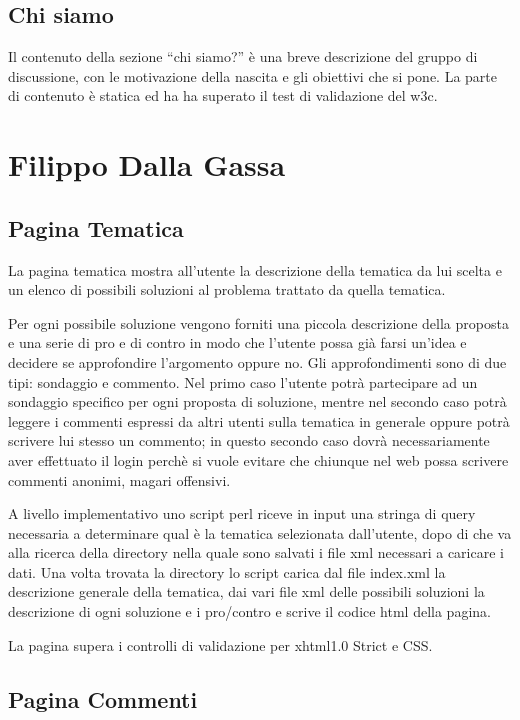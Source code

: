 \documentclass[a4paper,10pt]{article}
\begin{document}
\subsection{Chi siamo}

Il contenuto della sezione ``chi siamo?'' \`e una breve descrizione del gruppo di discussione, con le motivazione della nascita e gli obiettivi che si pone. La parte di contenuto \`e statica ed ha ha superato il test di validazione del w3c.

\section{Filippo Dalla Gassa}

\subsection{Pagina Tematica}

La pagina tematica mostra all'utente la descrizione della tematica da lui scelta e un elenco di possibili soluzioni al problema trattato da quella tematica.

Per ogni possibile soluzione vengono forniti una piccola descrizione della proposta e una serie di pro e di contro in modo che l'utente possa gi\`a farsi un'idea e decidere se approfondire l'argomento oppure no. Gli approfondimenti sono di due tipi: sondaggio e commento. Nel primo caso l'utente potr\`a partecipare ad un sondaggio specifico per ogni proposta di soluzione, mentre nel secondo caso potr\`a leggere i commenti espressi da altri utenti sulla tematica in generale oppure potr\`a scrivere lui stesso un commento; in questo secondo caso dovr\`a necessariamente aver effettuato il login perch\`e si vuole evitare che chiunque nel web possa scrivere commenti anonimi, magari offensivi.

A livello implementativo uno script perl riceve in input una stringa di query necessaria a determinare qual \`e la tematica selezionata dall'utente, dopo di che va alla ricerca della directory nella quale sono salvati i file xml necessari a caricare i dati. Una volta trovata la directory lo script carica dal file index.xml la descrizione generale della tematica, dai vari file xml delle possibili soluzioni la descrizione di ogni soluzione e i pro/contro e scrive il codice html della pagina.

La pagina supera i controlli di validazione per xhtml1.0 Strict e CSS.


\subsection{Pagina Commenti}
\end{document}
